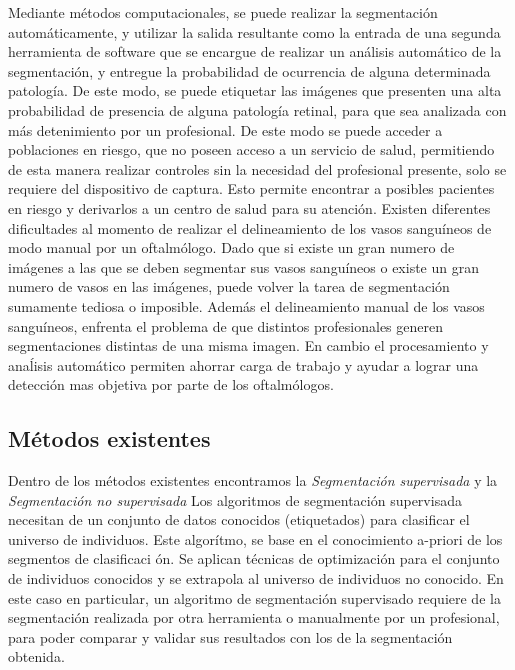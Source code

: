  
Mediante m\'etodos computacionales, se puede realizar la segmentación autom\'aticamente, y utilizar la salida resultante como la entrada de una segunda herramienta de software que se encargue de  realizar un an\'alisis autom\'atico de la segmentaci\'on, y entregue la probabilidad de ocurrencia de alguna determinada patolog\'ia. De este modo, se puede etiquetar las im\'agenes que presenten una alta  probabilidad de presencia de alguna patolog\'ia retinal, para que sea analizada con m\'as detenimiento por un profesional. De este modo se puede acceder a poblaciones en riesgo, que no poseen acceso a un servicio de salud, permitiendo de esta manera realizar controles sin la necesidad del profesional presente, solo se requiere del dispositivo de captura. Esto permite encontrar a posibles pacientes en riesgo y derivarlos a un centro de salud para su atenci\'on. 
Existen diferentes dificultades al momento de realizar el delineamiento de los vasos sangu\'ineos de modo manual por un oftalm\'ologo. Dado que si existe un gran numero de im\'agenes a las que se deben segmentar sus vasos sangu\'ineos o existe un gran numero de vasos en las im\'agenes, puede volver la tarea de segmentaci\'on sumamente tediosa o imposible. Adem\'as el delineamiento manual de los vasos sangu\'ineos, enfrenta el problema de que distintos profesionales generen segmentaciones distintas de una misma imagen. En cambio el procesamiento y ana\'lisis autom\'atico permiten ahorrar carga de trabajo y ayudar a lograr una detecci\'on mas objetiva por parte de los oftalm\'ologos. 

\subsection{M\'etodos existentes}
Dentro de los m\'etodos existentes encontramos la \textit{Segmentaci\'on supervisada} y la \textit{Segmentaci\'on no supervisada} 
Los algoritmos de segmentaci\'on supervisada necesitan de un conjunto de datos conocidos (etiquetados) para clasificar el universo de individuos. Este algor\'itmo, se base en el conocimiento a-priori de los segmentos de clasificaci \'on. Se aplican t\'ecnicas de optimizaci\'on para el conjunto de individuos conocidos y se extrapola al universo de individuos no conocido. En este caso en particular, un algoritmo de segmentaci\'on supervisado requiere de la segmentaci\'on realizada por otra herramienta o manualmente por un profesional, para poder comparar y validar sus resultados con los de la segmentaci\'on obtenida.\\


